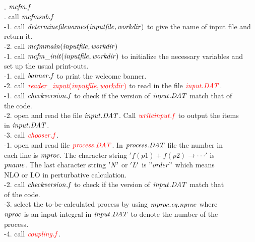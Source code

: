 \documentclass[epsf,preprint,aps,12pt,showpacs,nofootinbib,tightenlines]{revtex4}
\begin{document}
\\
. $\it{mcfm.f}$\\
. call $\it{mcfmsub.f}$\\
\quad{}-1. call $\it{determinefilenames(inputfile,workdir)}$ to give the name of input file and \\
\quad\quad \quad\quad return it. \\
\quad{}-2. call $\it{mcfmmain(inputfile,workdir)}$ \\
\quad\quad{}-1. call $\it{mcfm\_init(inputfile,workdir)}$ to initialize the necessary variables and\\
\quad\quad\quad\quad\quad set  up the usual print-outs.\\
\quad\quad\quad{}-1. call $\it{banner.f}$ to print the welcome banner.\\
\quad\quad\quad{}-2. call ${\color{red}\it{reader\_input(inputfile,workdir)}}$  to read in the file ${\color{red}\it{input.DAT}}$.\\
\quad\quad\quad\quad{}-1.  call $\it{checkversion.f}$ to check if the version of $\it{input.DAT}$ match that of \\\quad\quad\quad\quad\quad\quad\quad the code.\\ 
\quad\quad\quad\quad{}-2. open and read the file $\it{input.DAT}$. Call ${\color{red}\it{write input.f}}$ to output the items\\ \quad\quad\quad\quad\quad\quad\quad in $\it{input.DAT}$. \\
\quad\quad\quad\quad{}-3. call ${\color{red}\it{chooser.f}}$.\\
\quad\quad\quad\quad\quad{}-1. open and read file ${\color{red}\it{process.DAT}}$. In $\it{process.DAT}$ file the number in\\
\quad\quad\quad\quad\quad\quad\quad\quad each line is $\it{mproc}$. The character string $'  f(p1)+f(p2) \to \cdot\cdot\cdot '$ is \\
\quad\quad\quad\quad\quad\quad\quad\quad $\it{pname}$. The last character string $\it{'N'}$ or $\it{'L'}$ is $\it{"order"}$ which means\\
\quad\quad\quad\quad\quad\quad\quad\quad NLO or LO in perturbative calculation.\\
\quad\quad\quad\quad\quad{}-2. call $\it{checkversion.f}$ to check if the version of $\it{input.DAT}$ match that \\ \quad\quad\quad\quad\quad\quad\quad\quad of the code. \\ 
\quad\quad\quad\quad\quad{}-3. select the to-be-calculated process by using $\it{mproc .eq. nproc}$ where \\ \quad\quad\quad\quad\quad\quad\quad\quad $\it{nproc}$ is an input integral in $\it{input.DAT}$ to denote the number of the \\ \quad\quad\quad\quad\quad\quad\quad\quad process.\\
\quad\quad\quad\quad\quad{}-4. call ${\color{red}\it{coupling.f}}$.\\
\end{document}
